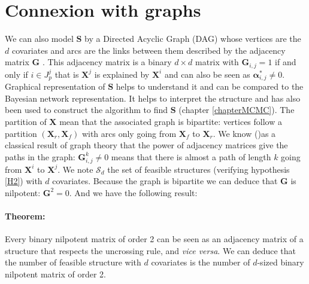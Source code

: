 \documentclass[12pt,a4paper]{report}
\begin{document}
 	\FloatBarrier		
			
		
\section{Connexion with graphs}\label{sectiongraph}
	We can also model $\boldsymbol{S}$ by a Directed Acyclic Graph (DAG) whose vertices are the $d$ covariates and arcs are the links  between them described by the adjacency matrix $\boldsymbol{G}$ \cite{bondy1976graph}. This adjacency matrix is a binary $d\times d$ matrix with $\boldsymbol{G}_{i,j}=1$ if and only if $i \in J_p^j$ that is $\boldsymbol{X}^j$ is explained by $\boldsymbol{X}^i$ and can also be seen as $\boldsymbol{\alpha}^*_{i,j}\neq 0$.\\
	
	Graphical representation of $\boldsymbol{S}$ helps to understand it and can be compared to the Bayesian network representation. It helps to interpret the structure and has also been used to construct the algorithm to find $\boldsymbol{S}$ (chapter \ref{chapterMCMC}).
	The partition of $\boldsymbol{X}$ mean that the associated graph is bipartite: vertices follow a partition $(\boldsymbol{X}_r,\boldsymbol{X}_f)$ with arcs only going from $\boldsymbol{X}_f$ to $\boldsymbol{X}_r$.
	We know (\cite{biggs1993algebraic})as a classical result of graph theory that the power of adjacency matrices give the paths in the graph: $\boldsymbol{G}^k_{i,j}\neq 0$ means that there is almost a path of length $k$ going from $\boldsymbol{X}^i$ to $\boldsymbol{X}^j$. We note $\mathcal{S}_d$ the set of feasible structures (verifying hypothesis \ref{H2}) with $d$ covariates. Because the graph is bipartite we can deduce that $\boldsymbol{G}$ is nilpotent: $\boldsymbol{G}^2=0$. And we have the following result:\\
	
	\paragraph{Theorem:} Every binary nilpotent matrix of order 2 can be seen as an adjacency matrix of a structure that respects the uncrossing rule, and {\it vice versa}. We can deduce that the number of feasible structure with $d$ covariates is the number of $d$-sized binary nilpotent matrix of order 2. \\
	 
\end{document}
